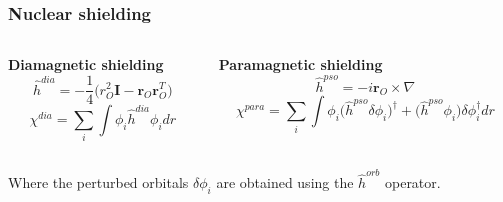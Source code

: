 \begin{frame}
\frametitle{Nuclear shielding}
\begin{columns}

\begin{column}[b]{0.5\textwidth}
\centering
\textbf{Diamagnetic shielding}
\begin{equation}
    \nonumber
    \hat{h}^{dia} = -\frac{1}{4}\Big(r_O^2\boldsymbol{I} - 
    \boldsymbol{r}_O\boldsymbol{r}_O^T\Big)
\end{equation}
\vspace{2mm}
\begin{equation}
    \nonumber
    \chi^{dia} = \sum_i \int \phi_i \hat{h}^{dia} \phi_i dr
\end{equation}
\end{column}

\begin{column}[b]{0.5\textwidth}
\centering
\textbf{Paramagnetic shielding}
\begin{equation}
    \nonumber
    \hat{h}^{pso} = -i \boldsymbol{r}_O\times\nabla
\end{equation}
\vspace{2mm}
\begin{equation}
    \nonumber
    \chi^{para} = \sum_i \int \phi_i \Big(\hat{h}^{pso} \delta\phi_i\Big)^\dag + 
    \Big(\hat{h}^{pso}\phi_i\Big)\delta\phi_i^\dag dr
\end{equation}
\end{column}

\end{columns}
\vspace{5mm}
\centering
Where the perturbed orbitals $\delta\phi_i$ are obtained using 
the $\hat{h}^{orb}$ operator.
\vspace{5mm}


\end{frame}
